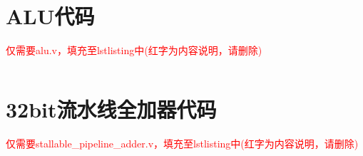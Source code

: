 \appendix
\section{ALU代码}
\textcolor{red}{仅需要alu.v，填充至lstlisting中(红字为内容说明，请删除)}
\begin{lstlisting}[language=Verilog]

\end{lstlisting}

\section{32bit流水线全加器代码}
\textcolor{red}{仅需要stallable\_pipeline\_adder.v，填充至lstlisting中(红字为内容说明，请删除)}
\begin{lstlisting}[language=Verilog]

\end{lstlisting}


